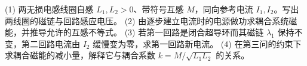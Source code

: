 (1) 两无损电感线圈自感 \(L_1,L_2>0\)、带符号互感 \(M\)，同向参考电流 \(I_1,I_2\)。写出两线圈的磁链与回路感应电压。
(2) 由逐步建立电流时的电源做功求耦合系统磁能，并推导允许的互感不等式。
(3) 若第一回路是闭合超导环而其磁链 \(\lambda_1\) 保持不变，第二回路电流由 \(I_2\) 缓慢变为零，求第一回路新电流。
(4) 在第三问的约束下求耦合磁能的减小量，解释它与耦合系数 \(k=M/\sqrt{L_1L_2}\) 的关系。
